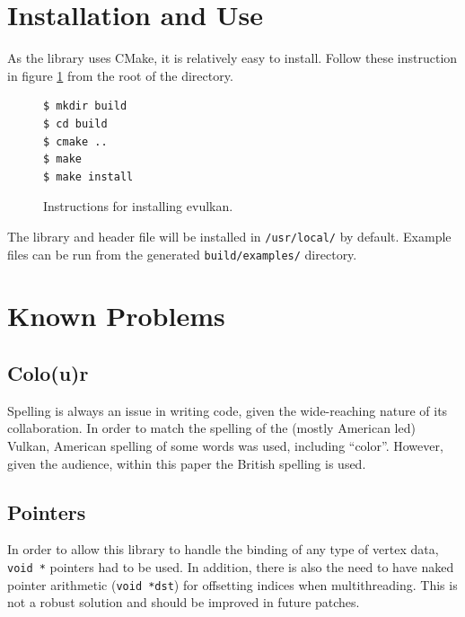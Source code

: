 \documentclass[12pt]{report}
\theoremstyle{definition}
\begin{document}
    \section{Installation and Use}

        As the library uses CMake, it is relatively easy to install. Follow
        these instruction in figure \ref{fig:installation} from the root of the directory.

          \begin{figure}[h!]
            \centering
            \begin{verbatim}
$ mkdir build
$ cd build
$ cmake ..
$ make
$ make install
            \end{verbatim}
            \caption{Instructions for installing evulkan.}
            \label{fig:installation}
          \end{figure}

        The library and header file will be installed in \texttt{/usr/local/} by default.
        Example files can be run from the generated \texttt{build/examples/} directory.

        
    \section{Known Problems}

      \subsection{Colo(u)r}

        Spelling is always an issue in writing code, given the wide-reaching
        nature of its collaboration. In order to match the spelling of the
        (mostly American led) Vulkan, American spelling of some words was used,
        including ``color''. However, given the audience, within this paper the
        British spelling is used.

      \subsection{Pointers}

        In order to allow this library to handle the binding of any type of
        vertex data, \verb|void *| pointers had to be used. In addition, there is also the need to
        have naked pointer arithmetic (\verb|void *dst|) for offsetting indices when multithreading. This is
        not a robust solution and should be improved in future patches.
\end{document}
